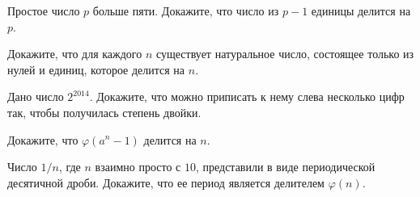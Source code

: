 \begin{problems}
\item
Простое число $p$ больше пяти.
Докажите, что число из $p - 1$ единицы делится на $p$.

\item
Докажите, что для каждого $n$ существует натуральное число, состоящее только из нулей и
единиц, которое делится на $n$.

\item
Дано число $2^{2014}$.
Докажите, что можно приписать к нему слева несколько цифр так, чтобы получилась степень
двойки.

\item
Докажите, что $\varphi (a^n - 1)$ делится на $n$.

\item
Число $1 / n$, где $n$ взаимно просто с $10$, представили в виде периодической
десятичной дроби.
Докажите, что ее период является делителем $\varphi(n)$.


\end{problems}


